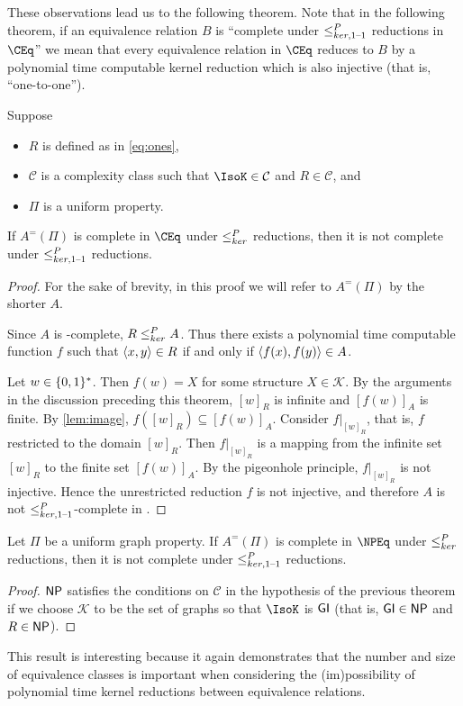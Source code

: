 These observations lead us to the following theorem.
Note that in the following theorem, if an equivalence relation $B$ is ``complete under $\leq^{P}_{ker,1\text{--}1}$ reductions in $\CEq$'' we mean that every equivalence relation in $\CEq$ reduces to $B$ by a polynomial time computable kernel reduction which is also injective (that is, ``one-to-one'').

\begin{theorem}
  Suppose
  \begin{itemize}
  \item $R$ is defined as in \eqref{eq:ones},
  \item $\mathcal{C}$ is a complexity class such that $\IsoK\in\mathcal{C}$ and $R\in\mathcal{C}$, and
  \item $\Pi$ is a uniform property.
  \end{itemize}
  If $A^=(\Pi)$ is complete in $\CEq$ under $\leq^{P}_{ker}$ reductions, then it is not complete under $\leq^{P}_{ker,1\text{--}1}$ reductions.
\end{theorem}
\begin{proof}
  For the sake of brevity, in this proof we will refer to $A^=(\Pi)$ by the shorter $A$.

  Since $A$ is \CEq-complete, $R\leq^{P}_{ker} A$.
  Thus there exists a polynomial time computable function $f$ such that $\left\langle x,y\right\rangle\in R$ if and only if $\left\langle f(x),f(y)\right\rangle\in A$.

  Let $w\in\{0, 1\}^{*}$.
  Then $f(w)=X$ for some structure $X\in\mathcal{K}$.
  By the arguments in the discussion preceding this theorem, $[w]_R$ is infinite and $[f(w)]_A$ is finite.
  By \autoref{lem:image}, $f([w]_R)\subseteq [f(w)]_A$.
  Consider $f|_{[w]_R}$, that is, $f$ restricted to the domain $[w]_R$.
  Then $f|_{[w]_R}$ is a mapping from the infinite set $[w]_R$ to the finite set $[f(w)]_A$.
  By the pigeonhole principle, $f|_{[w]_R}$ is not injective.
  Hence the unrestricted reduction $f$ is not injective, and therefore $A$ is not $\leq^{P}_{ker,1\text{--}1}$-complete in \CEq.
\end{proof}

\begin{corollary}
  Let $\Pi$ be a uniform graph property.
  If $A^=(\Pi)$ is complete in $\NPEq$ under $\leq^{P}_{ker}$ reductions, then it is not complete under $\leq^{P}_{ker,1\text{--}1}$ reductions.
\end{corollary}
\begin{proof}
  ${\mathsf{NP}}$ satisfies the conditions on $\mathcal{C}$ in the hypothesis of the previous theorem if we choose $\mathcal{K}$ to be the set of graphs so that $\IsoK$ is ${\mathsf{GI}}$ (that is, ${\mathsf{GI}}\in{\ensuremath{\mathsf{NP}}}$ and $R\in{\ensuremath{\mathsf{NP}}}$).
\end{proof}

This result is interesting because it again demonstrates that the number and size of equivalence classes is important when considering the (im)possibility of polynomial time kernel reductions between equivalence relations.
